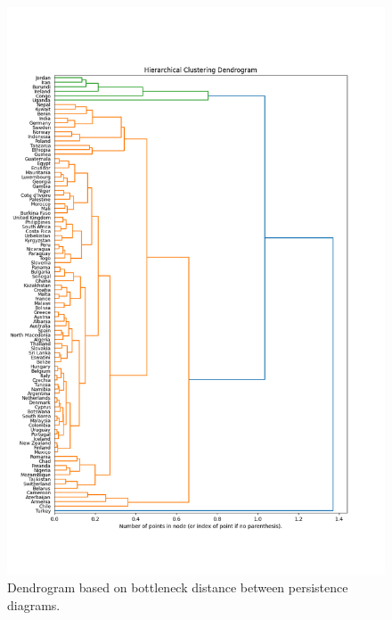 \documentclass[12pt]{article}
\begin{document}
\begin{figure}[t]
	\centering
	\includegraphics[width=15cm]{bottleneck.png}
	\caption{Dendrogram based on bottleneck distance between persistence diagrams.}
\end{figure}
\end{document}
